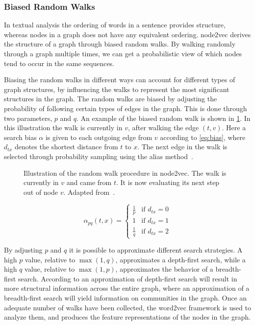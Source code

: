 \subsubsection{Biased Random Walks}
In textual analysis the ordering of words in a sentence provides structure, whereas nodes in a graph does not have any equivalent ordering. node2vec derives the structure of a graph through biased random walks. By walking randomly through a graph multiple times, we can get a probabilistic view of which nodes tend to occur in the same sequences.

Biasing the random walks in different ways can account for different types of graph structures, by influencing the walks to represent the most significant structures in the graph. The random walks are biased by adjusting the probability of following certain types of edges in the graph. This is done through two parameters, $p$ and $q$. An example of the biased random walk is shown in \cref{fig:randomwalk}. In this illustration the walk is currently in $v$, after walking the edge $(t,v)$. Here a search bias $\alpha$ is given to each outgoing edge from $v$ according to \cref{eq:bias}, where $d_{tx}$ denotes the shortest distance from $t$ to $x$. The next edge in the walk is selected through probability sampling using the alias method~\cite{alias-method}.

\begin{figure}%
  \centering
  
\caption[Illustration of random walk in node2vec]{Illustration of the random walk procedure in node2vec. The walk is currently in $v$ and came from $t$. It is now evaluating its next step out of node $v$. Adapted from~\cite{node2vec}.}%
\label{fig:randomwalk}%
\end{figure}

\begin{equation}
\label{eq:bias}
\alpha_{pq}(t,x)=
\begin{cases}
  \frac{1}{p} & \text{if } d_{tx}=0 \\
  1           & \text{if } d_{tx}=1 \\
  \frac{1}{q} & \text{if } d_{tx}=2
\end{cases}
\end{equation}

By adjusting $p$ and $q$ it is possible to approximate different search strategies. A high $p$ value, relative to $\max(1,q)$, approximates a depth-first search, while a high $q$ value, relative to $\max(1,p)$, approximates the behavior of a breadth-first search. According to \cite{node2vec} an approximation of depth-first search will result in more structural information across the entire graph, where an approximation of a breadth-first search will yield information on communities in the graph.
Once an adequate number of walks have been collected, the word2vec framework is used to analyze them, and produces the feature representations of the nodes in the graph.